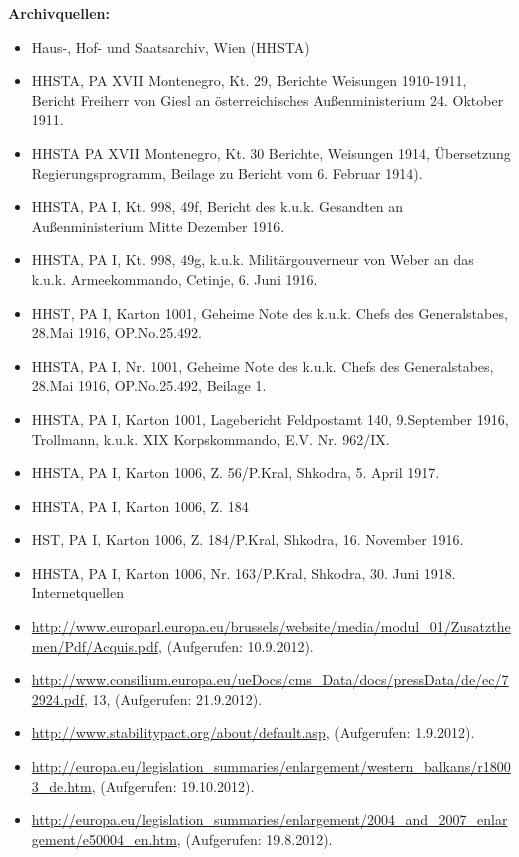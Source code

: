 \nocite{*}
\printbibliography
\vspace{0,3cm}
\textbf{Archivquellen:}\vspace{0,2cm}
\begin{itemize}[label={},leftmargin=*,itemsep=0pt]
\item Haus-, Hof- und Saatsarchiv, Wien (HHSTA)
\item HHSTA, PA XVII Montenegro, Kt. 29, Berichte Weisungen 1910-1911, Bericht Freiherr von Giesl an österreichisches Außenministerium 24. Oktober 1911.
\item HHSTA PA XVII Montenegro, Kt. 30 Berichte, Weisungen 1914, Übersetzung Regierungsprogramm, Beilage zu Bericht vom 6. Februar 1914).
\item HHSTA, PA I, Kt. 998, 49f, Bericht des k.u.k. Gesandten an Außenministerium Mitte Dezember 1916.
\item HHSTA, PA I, Kt. 998, 49g, k.u.k. Militärgouverneur von Weber an das k.u.k. Armeekommando, Cetinje, 6. Juni 1916.
\item HHST, PA I, Karton 1001, Geheime Note des k.u.k. Chefs des Generalstabes, 28.Mai 1916, OP.No.25.492.
\item HHSTA, PA I, Nr. 1001, Geheime Note des k.u.k. Chefs des Generalstabes, 28.Mai 1916, OP.No.25.492, Beilage 1.
\item HHSTA, PA I, Karton 1001, Lagebericht Feldpostamt 140, 9.September 1916, Trollmann, k.u.k. XIX Korpskommando, E.V. Nr. 962/IX.
\item HHSTA, PA I, Karton 1006, Z. 56/P.Kral, Shkodra, 5. April 1917. 
\item HHSTA, PA I, Karton 1006, Z. 184
\item HST, PA I, Karton 1006, Z. 184/P.Kral, Shkodra, 16. November 1916.
\item HHSTA, PA I, Karton 1006, Nr. 163/P.Kral, Shkodra, 30. Juni 1918.
Internetquellen
\item\url{http://www.europarl.europa.eu/brussels/website/media/modul_01/Zusatzthemen/Pdf/Acquis.pdf}, (Aufgerufen: 10.9.2012).
\item\url{http://www.consilium.europa.eu/ueDocs/cms_Data/docs/pressData/de/ec/72924.pdf}, 13, (Aufgerufen: 21.9.2012).
\item\url{http://www.stabilitypact.org/about/default.asp}, (Aufgerufen: 1.9.2012).
\item\url{http://europa.eu/legislation_summaries/enlargement/western_balkans/r18003_de.htm}, (Aufgerufen: 19.10.2012).
\item\url{http://europa.eu/legislation_summaries/enlargement/2004_and_2007_enlargement/e50004_en.htm}, (Aufgerufen: 19.8.2012).

\end{itemize}
